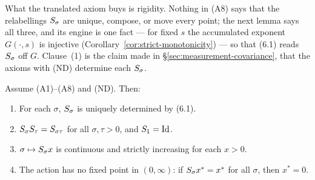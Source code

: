What the translated axiom buys is rigidity. Nothing in (A8) says that the relabellings
$S_\sigma$ are unique, compose, or move every point; the next lemma says all three, and
its engine is one fact --- for fixed $s$ the accumulated exponent $G(\cdot, s)$ is injective
(Corollary~\ref{cor:strict-monotonicity}) --- so that (6.1) reads $S_\sigma$ off $G$.
Clause~(1) is the claim made in \S\ref{sec:measurement-covariance}, that the axioms with (ND)
determine each $S_\sigma$.

\begin{lemma}\label{lem:action-rigidity}
Assume (A1)--(A8) and (ND). Then:
\begin{enumerate}
\item For each $\sigma$, $S_\sigma$ is uniquely determined by (6.1).
\item $S_\sigma S_\tau = S_{\sigma\tau}$ for all $\sigma, \tau > 0$, and
$S_1 = \mathrm{Id}$.
\item $\sigma \mapsto S_\sigma x$ is continuous and strictly increasing for each $x > 0$.
\item The action has no fixed point in $(0,\infty)$: if $S_\sigma x^* = x^*$ for all
$\sigma$, then $x^* = 0$.
\end{enumerate}
\end{lemma}

